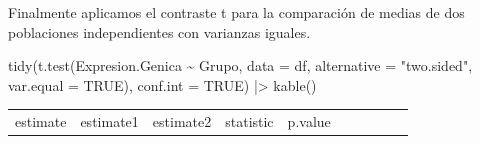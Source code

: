 \documentclass[
  spanish,
  a4paper,
]{scrreport}
\newenvironment{Shaded}{\begin{snugshade}}{\end{snugshade}}
\newcommand{\AttributeTok}[1]{\textcolor[rgb]{0.40,0.45,0.13}{#1}}
\newcommand{\ConstantTok}[1]{\textcolor[rgb]{0.56,0.35,0.01}{#1}}
\newcommand{\FunctionTok}[1]{\textcolor[rgb]{0.28,0.35,0.67}{#1}}
\newcommand{\NormalTok}[1]{\textcolor[rgb]{0.00,0.23,0.31}{#1}}
\newcommand{\SpecialCharTok}[1]{\textcolor[rgb]{0.37,0.37,0.37}{#1}}
\newcommand{\StringTok}[1]{\textcolor[rgb]{0.13,0.47,0.30}{#1}}
\newcounter{none} %
\theoremstyle{definition}
\theoremstyle{remark}
\begin{document}
\begin{tcolorbox}
Finalmente aplicamos el contraste t para la comparación de medias de dos
poblaciones independientes con varianzas iguales.

\begin{Shaded}
\begin{Highlighting}[]
\FunctionTok{tidy}\NormalTok{(}\FunctionTok{t.test}\NormalTok{(Expresion.Genica }\SpecialCharTok{\textasciitilde{}}\NormalTok{ Grupo, }\AttributeTok{data =}\NormalTok{ df, }\AttributeTok{alternative =} \StringTok{"two.sided"}\NormalTok{, }\AttributeTok{var.equal =} \ConstantTok{TRUE}\NormalTok{), }\AttributeTok{conf.int =} \ConstantTok{TRUE}\NormalTok{) }\SpecialCharTok{|\textgreater{}} 
    \FunctionTok{kable}\NormalTok{()}
\end{Highlighting}
\end{Shaded}

{\def\LTcaptype{none} %
\begin{longtable}[]{@{}
  >{\raggedleft\arraybackslash}p{}
  >{\raggedleft\arraybackslash}p{}
  >{\raggedleft\arraybackslash}p{}
  >{\raggedleft\arraybackslash}p{}
  >{\raggedleft\arraybackslash}p{}
  >{\raggedleft\arraybackslash}p{}
  >{\raggedleft\arraybackslash}p{}
  >{\raggedleft\arraybackslash}p{}
  >{\raggedright\arraybackslash}p{}
  >{\raggedright\arraybackslash}p{}@{}}
\toprule\noalign{}
\begin{minipage}[b]{\linewidth}\raggedleft
estimate
\end{minipage} & \begin{minipage}[b]{\linewidth}\raggedleft
estimate1
\end{minipage} & \begin{minipage}[b]{\linewidth}\raggedleft
estimate2
\end{minipage} & \begin{minipage}[b]{\linewidth}\raggedleft
statistic
\end{minipage} & \begin{minipage}[b]{\linewidth}\raggedleft
p.value
\end{minipage} & \begin{minipage}[b]{\linewidth}\raggedleft

\end{minipage}
\end{longtable}}
\end{tcolorbox}
\end{document}
